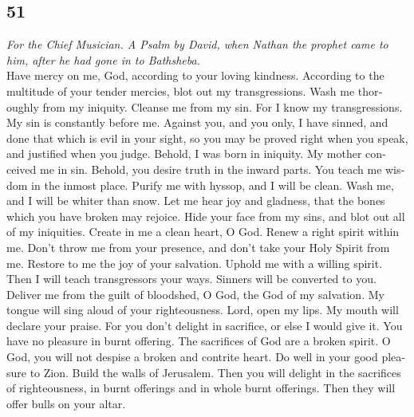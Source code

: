 \begin{paracol}{2}
\switchcolumn
\begin{otherlanguage}{english}

\hypertarget{section-101}{%
\section{51}\label{section-101}}

\emph{For the Chief Musician. A Psalm by David, when Nathan the prophet
came to him, after he had gone in to Bathsheba.}\\
 Have mercy on me, God, according to your loving kindness.
According to the multitude of your tender mercies, blot out my
transgressions.  Wash me thoroughly from my iniquity.
Cleanse me from my sin.  For I know my transgressions. My
sin is constantly before me.  Against you, and you only, I
have sinned, and done that which is evil in your sight, so you may be
proved right when you speak, and justified when you judge.
 Behold, I was born in iniquity. My mother conceived me in
sin.  Behold, you desire truth in the inward parts. You
teach me wisdom in the inmost place.  Purify me with
hyssop, and I will be clean. Wash me, and I will be whiter than snow.
 Let me hear joy and gladness, that the bones which you
have broken may rejoice.  Hide your face from my sins, and
blot out all of my iniquities.  Create in me a clean
heart, O God. Renew a right spirit within me.  Don't
throw me from your presence, and don't take your Holy Spirit from me.
 Restore to me the joy of your salvation. Uphold me with
a willing spirit.  Then I will teach transgressors your
ways. Sinners will be converted to you.  Deliver me from
the guilt of bloodshed, O God, the God of my salvation. My tongue will
sing aloud of your righteousness.  Lord, open my lips. My
mouth will declare your praise.  For you don't delight in
sacrifice, or else I would give it. You have no pleasure in burnt
offering.  The sacrifices of God are a broken spirit. O
God, you will not despise a broken and contrite heart. 
Do well in your good pleasure to Zion. Build the walls of Jerusalem.
 Then you will delight in the sacrifices of
righteousness, in burnt offerings and in whole burnt offerings. Then
they will offer bulls on your altar.

\end{otherlanguage}


\end{paracol}
